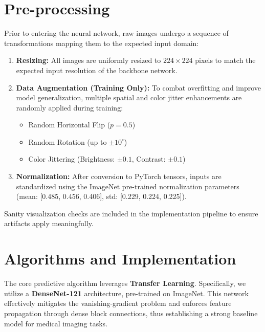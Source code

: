 \documentclass[orivec]{llncs}
\begin{document}
\section{Pre-processing}
Prior to entering the neural network, raw images undergo a sequence of transformations mapping them to the expected input domain:
\begin{enumerate}
    \item \textbf{Resizing:} All images are uniformly resized to \(224 \times 224\) pixels to match the expected input resolution of the backbone network.
    \item \textbf{Data Augmentation (Training Only):} To combat overfitting and improve model generalization, multiple spatial and color jitter enhancements are randomly applied during training:
    \begin{itemize}
        \item Random Horizontal Flip ($p = 0.5$)
        \item Random Rotation (up to $\pm 10^\circ$)
        \item Color Jittering (Brightness: $\pm 0.1$, Contrast: $\pm 0.1$)
    \end{itemize}
    \item \textbf{Normalization:} After conversion to PyTorch tensors, inputs are standardized using the ImageNet pre-trained normalization parameters (mean: [0.485, 0.456, 0.406], std: [0.229, 0.224, 0.225]).
\end{enumerate}
Sanity visualization checks are included in the implementation pipeline to ensure artifacts apply meaningfully. 

\section{Algorithms and Implementation}
The core predictive algorithm leverages \textbf{Transfer Learning}. Specifically, we utilize a \textbf{Dense\-Net-121} architecture, pre-trained on ImageNet. This network effectively mitigates the vanishing-gradient problem and enforces feature propagation through dense block connections, thus establishing a strong baseline model for medical imaging tasks.
\end{document}
